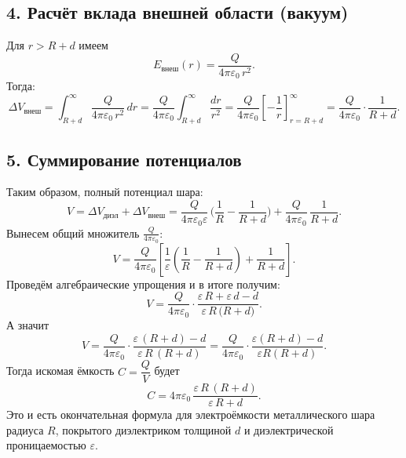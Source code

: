 \documentclass{article}
\begin{document}
\subsection*{4. Расчёт вклада внешней области (вакуум)}
Для \(r > R + d\) имеем
\[
E_{\text{внеш}}(r) = \frac{Q}{4\pi \varepsilon_0\,r^2}.
\]
Тогда:
\[
\Delta V_{\text{внеш}}
= \int_{R+d}^{\infty} \frac{Q}{4\pi \varepsilon_0\,r^2}\,dr
= \frac{Q}{4\pi \varepsilon_0}\int_{R+d}^{\infty} \frac{dr}{r^2}
= \frac{Q}{4\pi \varepsilon_0}
\left[-\frac{1}{r}\right]_{r=R+d}^{\infty}
= \frac{Q}{4\pi \varepsilon_0} \cdot \frac{1}{R + d}.
\]

\subsection*{5. Суммирование потенциалов}
Таким образом, полный потенциал шара:
\[
V
= \Delta V_{\text{диэл}} + \Delta V_{\text{внеш}}
= \frac{Q}{4\pi \varepsilon_0 \varepsilon}\,\biggl(\frac{1}{R} - \frac{1}{R + d}\biggr)
+ \frac{Q}{4\pi \varepsilon_0}\,\frac{1}{R + d}.
\]
Вынесем общий множитель \(\displaystyle \frac{Q}{4\pi \varepsilon_0}\):
\[
V
= \frac{Q}{4\pi \varepsilon_0}
\left[
\frac{1}{\varepsilon}
\left(\frac{1}{R} - \frac{1}{R + d}\right)
+ \frac{1}{R + d}
\right].
\]
Проведём алгебраические упрощения и в итоге получим:
\[
V
= \frac{Q}{4\pi \varepsilon_0}
\cdot
\frac{\varepsilon\,R + \varepsilon\,d - d}{\varepsilon\,R\,\bigl(R + d\bigr)}.
\]
А значит
\[
V
= \frac{Q}{4\pi \varepsilon_0}
\cdot
\frac{\varepsilon\,(R + d) - d}{\varepsilon\,R\,(R + d)}
= \frac{Q}{4\pi \varepsilon_0}
\cdot
\frac{\varepsilon(R + d) - d}{\varepsilon R (R + d)}.
\]
Тогда искомая ёмкость \(C = \dfrac{Q}{V}\) будет
\[
\boxed{
C
= 4\pi \varepsilon_0\,\frac{\varepsilon\,R\,(R + d)}{\varepsilon\,R + d}.
}
\]
Это и есть окончательная формула для электроёмкости металлического шара радиуса \(R\), покрытого диэлектриком толщиной \(d\) и диэлектрической проницаемостью \(\varepsilon\).
\end{document}

